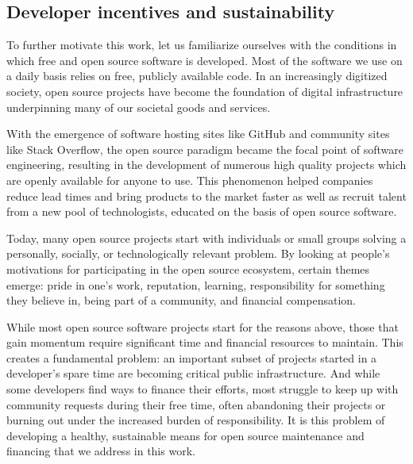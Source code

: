 \subsection{Developer incentives and sustainability}
\label{s:incentives}

To further motivate this work, let us familiarize ourselves with the
conditions in which free and open source software is developed. Most of the
software we use on a daily basis relies on free, publicly available code. In an
increasingly digitized society, open source projects have become the
foundation of digital infrastructure underpinning many of our societal goods
and services.

With the emergence of software hosting sites like GitHub and community sites
like Stack Overflow, the open source paradigm became the focal point of
software engineering, resulting in the development of numerous high quality
projects which are openly available for anyone to use. This phenomenon helped
companies reduce lead times and bring products to the market faster as well as
recruit talent from a new pool of technologists, educated on the basis of
open source software.

Today, many open source projects start with individuals or small groups
solving a personally, socially, or technologically relevant problem. By
looking at people's motivations for participating in the open source ecosystem,
certain themes emerge: pride in one's work, reputation, learning,
responsibility for something they believe in, being part of a community, and
financial compensation.

While most open source software projects start for the reasons above, those
that gain momentum require significant time and financial resources to
maintain.  This creates a fundamental problem: an important subset of projects
started in a developer's spare time are becoming critical public
infrastructure. And while some developers find ways to finance their efforts,
most struggle to keep up with community requests during their free time, often
abandoning their projects or burning out under the increased burden of
responsibility. It is this problem of developing a healthy, sustainable means
for open source maintenance and financing that we address in this work.
